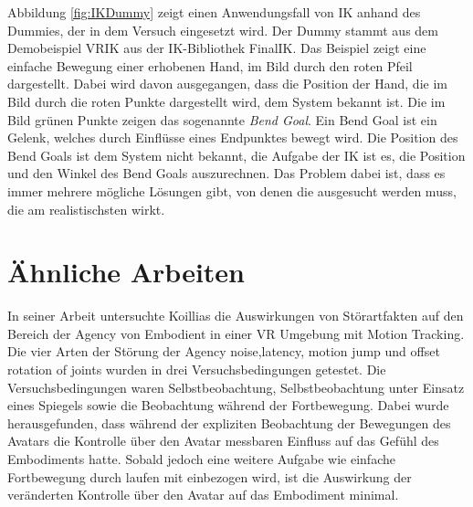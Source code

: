 Abbildung \ref{fig:IKDummy} zeigt einen Anwendungsfall von IK anhand des Dummies, der in dem Versuch eingesetzt wird. Der Dummy stammt aus dem Demobeispiel VRIK aus der IK-Bibliothek FinalIK. Das Beispiel zeigt eine einfache Bewegung einer erhobenen Hand, im Bild durch den roten Pfeil dargestellt.
Dabei wird davon ausgegangen, dass die Position der Hand, die im Bild durch die roten Punkte dargestellt wird, dem System bekannt ist. Die im Bild grünen Punkte zeigen das sogenannte \textit{Bend Goal}. Ein Bend Goal ist ein Gelenk, welches durch Einflüsse eines Endpunktes bewegt wird. Die Position des Bend Goals ist dem System nicht bekannt, die Aufgabe der IK ist es, die Position und den Winkel des Bend Goals auszurechnen. Das Problem dabei ist, dass es immer mehrere mögliche Lösungen gibt, von denen die ausgesucht werden muss, die am realistischsten wirkt.


\section{Ähnliche Arbeiten}
In seiner Arbeit untersuchte Koillias \cite{Koilias2019} die Auswirkungen von Störartfakten auf den Bereich der Agency von Embodient in einer VR Umgebung mit Motion Tracking. Die vier Arten der Störung der Agency noise,latency, motion jump und offset rotation of joints wurden in drei Versuchsbedingungen getestet. Die Versuchsbedingungen waren Selbstbeobachtung, Selbstbeobachtung unter Einsatz eines Spiegels sowie die Beobachtung während der Fortbewegung. Dabei wurde herausgefunden, dass während der expliziten Beobachtung der Bewegungen des Avatars die Kontrolle über den Avatar messbaren Einfluss auf das Gefühl des Embodiments hatte. Sobald jedoch eine weitere Aufgabe wie einfache Fortbewegung durch laufen mit einbezogen wird, ist die Auswirkung der veränderten Kontrolle über den Avatar auf das Embodiment minimal. 